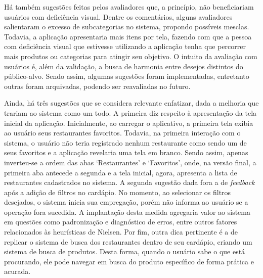 Há também sugestões feitas pelos avaliadores que, a princípio, não beneficiariam usuários com deficiência visual. Dentre os comentários, alguns avaliadores salientaram o excesso de subcategorias no sistema, propondo possíveis mesclas. Todavia, a aplicação apresentaria mais itens por tela, fazendo com que a pessoa com deficiência visual que estivesse utilizando a aplicação tenha que percorrer mais produtos ou categorias para atingir seu objetivo. O intuito da avaliação com usuários é, além da validação, a busca de harmonia entre desejos distintos do público-alvo. Sendo assim, algumas sugestões foram implementadas, entretanto outras foram arquivadas, podendo ser reavaliadas no futuro.

Ainda, há três sugestões que se considera relevante enfatizar, dada a melhoria que trariam ao sistema como um todo. A primeira diz respeito à apresentação da tela inicial da aplicação. Inicialmente, ao carregar o aplicativo, a primeira tela exibia ao usuário seus restaurantes favoritos. Todavia, na primeira interação com o sistema, o usuário não teria registrado nenhum restaurante como sendo um de seus favoritos e a aplicação revelaria uma tela em branco. Sendo assim, apenas inverteu-se a ordem das abas ‘Restaurantes’ e ‘Favoritos’, onde, na versão final, a primeira aba antecede a segunda e a tela inicial, agora, apresenta a lista de restaurantes cadastrados no sistema. A segunda sugestão dada fora a de \emph{feedback} após a adição de filtros no cardápio. No momento, ao selecionar os filtros desejados, o sistema inicia sua empregação, porém não informa ao usuário se a operação fora sucedida. A implantação desta medida agregaria valor ao sistema em questões como padronização e diagnóstico de erros, entre outros fatores relacionados às heurísticas de Nielsen. Por fim, outra dica pertinente é a de replicar o sistema de busca dos restaurantes dentro de seu cardápio, criando um sistema de busca de produtos. Desta forma, quando o usuário sabe o que está procurando, ele pode navegar em busca do produto específico de forma prática e acurada.

\color{black}
